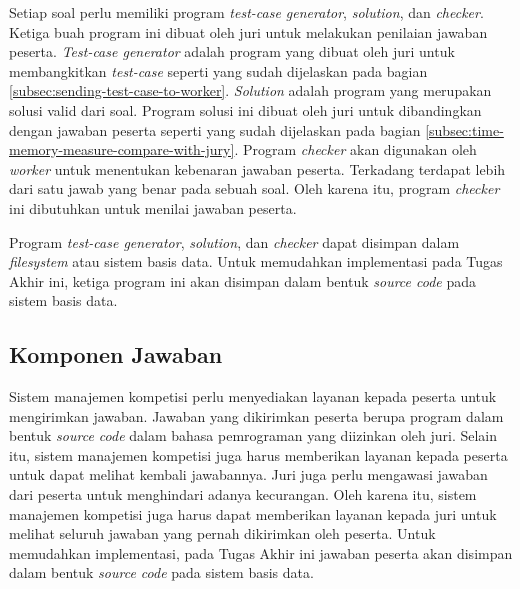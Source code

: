 \par Setiap soal perlu memiliki program \textit{test-case generator}, \textit{solution}, dan \textit{checker}. Ketiga buah program ini dibuat oleh juri untuk melakukan penilaian jawaban peserta. \textit{Test-case generator} adalah program yang dibuat oleh juri untuk membangkitkan \textit{test-case} seperti yang sudah dijelaskan pada bagian \ref{subsec:sending-test-case-to-worker}. \textit{Solution} adalah program yang merupakan solusi valid dari soal. Program solusi ini dibuat oleh juri untuk dibandingkan dengan jawaban peserta seperti yang sudah dijelaskan pada bagian \ref{subsec:time-memory-measure-compare-with-jury}. Program \textit{checker} akan digunakan oleh \textit{worker} untuk menentukan kebenaran jawaban peserta. Terkadang terdapat lebih dari satu jawab yang benar pada sebuah soal. Oleh karena itu, program \textit{checker} ini dibutuhkan untuk menilai jawaban peserta. 

\par Program \textit{test-case generator}, \textit{solution}, dan \textit{checker} dapat disimpan dalam \textit{filesystem} atau sistem basis data. Untuk memudahkan implementasi pada Tugas Akhir ini, ketiga program ini akan disimpan dalam bentuk \textit{source code} pada sistem basis data.

\subsection{Komponen Jawaban}

\par Sistem manajemen kompetisi perlu menyediakan layanan kepada peserta untuk mengirimkan jawaban. Jawaban yang dikirimkan peserta berupa program dalam bentuk \textit{source code} dalam bahasa pemrograman yang diizinkan oleh juri. Selain itu, sistem manajemen kompetisi juga harus memberikan layanan kepada peserta untuk dapat melihat kembali jawabannya. Juri juga perlu mengawasi jawaban dari peserta untuk menghindari adanya kecurangan.  Oleh karena itu, sistem manajemen kompetisi juga harus dapat memberikan layanan kepada juri untuk melihat seluruh jawaban yang pernah dikirimkan oleh peserta. Untuk memudahkan implementasi, pada Tugas Akhir ini jawaban peserta akan disimpan dalam bentuk \textit{source code} pada sistem basis data.

